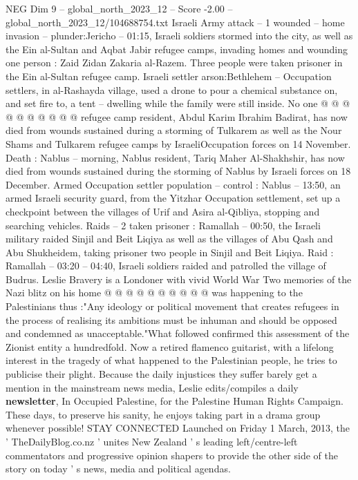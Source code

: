\begin{textsample}{NEG Dim 9 – global\_north\_2023\_12 – Score -2.00 – global\_north\_2023\_12/104688754.txt}
Israeli Army attack -- 1 wounded -- home invasion -- plunder:Jericho -- 01:15, Israeli soldiers stormed into the city, as well as the Ein al-Sultan and Aqbat Jabir refugee camps, invading homes and wounding one person : Zaid Zidan Zakaria al-Razem.
Three people were taken prisoner in the Ein al-Sultan refugee camp.
Israeli settler arson:Bethlehem -- Occupation settlers, in al-Rashayda village, used a drone to pour a chemical substance on, and set fire to, a tent -- dwelling while the family were still inside.
No one @ @ @ @ @ @ @ @ @ @ refugee camp resident, Abdul Karim Ibrahim Badirat, has now died from wounds sustained during a storming of Tulkarem as well as the Nour Shams and Tulkarem refugee camps by IsraeliOccupation forces on 14 November.
Death : Nablus -- morning, Nablus resident, Tariq Maher Al-Shakhshir, has now died from wounds sustained during the storming of Nablus by Israeli forces on 18 December.
Armed Occupation settler population -- control : Nablus -- 13:50, an armed Israeli security guard, from the Yitzhar Occupation settlement, set up a checkpoint between the villages of Urif and Asira al-Qibliya, stopping and searching vehicles.
Raids -- 2 taken prisoner : Ramallah -- 00:50, the Israeli military raided Sinjil and Beit Liqiya as well as the villages of Abu Qash and Abu Shukheidem, taking prisoner two people in Sinjil and Beit Liqiya.
Raid : Ramallah -- 03:20 -- 04:40, Israeli soldiers raided and patrolled the village of Budrus.
Leslie Bravery is a Londoner with vivid World War Two memories of the Nazi blitz on his home @ @ @ @ @ @ @ @ @ @ was happening to the Palestinians thus :"Any ideology or political movement that creates refugees in the process of realising its ambitions must be inhuman and should be opposed and condemned as unacceptable."What followed confirmed this assessment of the Zionist entity a hundredfold.
Now a retired flamenco guitarist, with a lifelong interest in the tragedy of what happened to the Palestinian people, he tries to publicise their plight.
Because the daily injustices they suffer barely get a mention in the mainstream news media, Leslie edits/compiles a daily \textbf{newsletter}, In Occupied Palestine, for the Palestine Human Rights Campaign.
These days, to preserve his sanity, he enjoys taking part in a drama group whenever possible!
STAY CONNECTED Launched on Friday 1 March, 2013, the ' TheDailyBlog.co.nz ' unites New Zealand ' s leading left/centre-left commentators and progressive opinion shapers to provide the other side of the story on today ' s news, media and political agendas.

\end{textsample}
